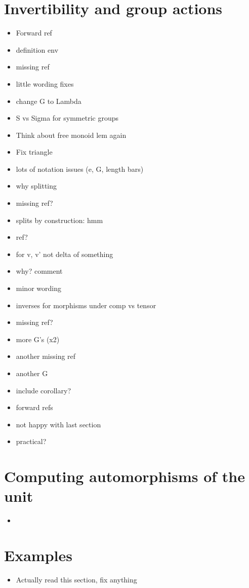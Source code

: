 \documentclass{amsart}
\begin{document}
\section{ Invertibility and group actions}
\begin{itemize}
\item Forward ref
\item definition env
\item missing ref
\item little wording fixes
\item change G to Lambda
\item S vs Sigma for symmetric groups
\item Think about free monoid lem again
\item Fix triangle
\item lots of notation issues (e, G, length bars)
\item why splitting
\item missing ref?
\item splits by construction: hmm
\item ref?
\item for v, v' not delta of something
\item why? comment
\item minor wording
\item inverses for morphisms under comp vs tensor
\item missing ref?
\item more G's (x2)
\item another missing ref
\item another G
\item include corollary?
\item forward refs
\item not happy with last section
\item practical?
\end{itemize}

\section{ Computing automorphisms of the unit}
\begin{itemize}
\item 

\end{itemize}
\section{ Examples}
\begin{itemize}
\item Actually read this section, fix anything
\end{itemize}
\end{document}
